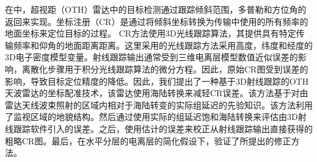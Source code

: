 在\cite{cacciamano2012coordinate}中，超视距（OTH）雷达中的目标检测通过跟踪倾斜范围，多普勒和方位角的返回来实现。坐标注册（CR）是通过将倾斜坐标转换为传输中使用的所有频率的地面坐标来定位目标的过程。 CR方法使用3D光线跟踪算法，其提供具有特定传输频率和仰角的地面距离距离。这里采用的光线跟踪方法采用高度，纬度和经度的3D电子密度模型变量。射线跟踪输出通常受到三维电离层模型数值近似误差的影响，离散化步骤用于积分光线跟踪算法的微分方程。因此，原始CR图受到误差的影响，导致目标定位精度的降低。因此，我们提出了一种基于3D射线跟踪的OTH天波雷达的坐标配准技术，该雷达使用海陆转换来减轻CR误差。该方法基于对由雷达天线波束照射的区域内相对于海陆转变的实际组延迟的先验知识。该方法利用了监视区域的地貌结构。然后通过使用实际的组延迟饱和海陆转换来评估由3D射线跟踪软件引入的误差。之后，使用估计的误差来校正从射线跟踪输出直接获得的粗略CR图。最后，在水平分层的电离层的简化假设下，验证了所提出的修正方法。


